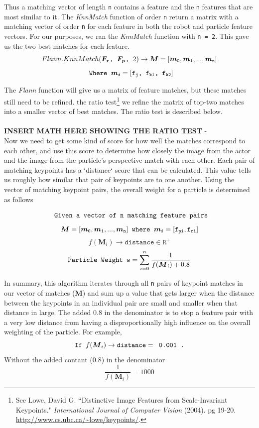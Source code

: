 \documentclass[a4paper,11pt]{article}
\begin{document}
 Thus a matching vector of length \texttt{n} contains a feature and the \texttt{n} features that are most similar to it. The \emph{KnnMatch} function of order \texttt{n} return a matrix with a matching vector of order \texttt{n} for each feature in both the robot and particle feature vectors. For our purposes, we ran the \emph{KnnMatch} function with \texttt{n = 2}. This gave us the two best matches for each feature.
 \[ Flann.KnnMatch(\boldsymbol{F_r} \verb., . \boldsymbol{F_p} \verb., . 2) \to \boldsymbol{M} = \mathtt{ [\boldsymbol{m}_0, \boldsymbol{m}_1, ... , \boldsymbol{m}_n ]} \]
 \[ \verb. Where . \boldsymbol{m_i} = \mathtt{ [f_{j}} \verb., . \mathtt{f_{k1}} \verb., . \mathtt{f_{k2}} ]\]

 The \emph{Flann} function will give us a matrix of feature matches, but these matches still need to be refined. the ratio test\footnote{See Lowe, David G. ``Distinctive Image Features from Scale-Invariant Keypoints." {\it International Journal of Computer Vision} (2004). pg 19-20.  \url{http://www.cs.ubc.ca/~lowe/keypoints/}.} we refine the matrix of top-two matches into a smaller vector of best matches. The ratio test is described below.
\\ \\
 \textbf{INSERT MATH HERE SHOWING THE RATIO TEST}
-\\
  Now we need to get some kind of score for how well the matches correspond to each other, and use this score to determine how closely the image from the actor and the image from the particle's perspective match with each other. Each pair of matching keypoints has a `distance` score that can be calculated. This value tells us roughly how similar that pair of keypoints are to one another. Using the vector of matching keypoint pairs, the overall weight for a particle is determined as follows

\[  \verb. Given a vector of . \mathtt{n} \verb. matching feature pairs. \]
\[  \boldsymbol{M} = \mathtt{ [\boldsymbol{m}_0, \boldsymbol{m}_1, ... , \boldsymbol{m}_n} ]  \verb. where . \boldsymbol{m_i} = \mathtt{ \mathtt{[f_{pi}, f_{ri}]} }   \]
\[  f(\boldsymbol{M}_i) \to \mathtt{distance} \in \mathtt{R^+}   \]
\[  \verb.Particle Weight . \mathtt{w} = \sum_{i=0}^{n} \frac 1{f(\boldsymbol{M}_i) + 0.8} \]

In summary, this algorithm iterates through all \texttt{n} pairs of keypoint matches in our vector of matches (\textbf{M}) and sum up a value that gets larger when the distance between the keypoints in an individual pair are small and smaller when that distance in large. The added 0.8 in the denominator is to stop a feature pair with a very low distance from having a disproportionally high influence on the overall weighting of the particle. For example,
\[ \verb.If . f(\boldsymbol{M}_i) \to \mathtt{distance} = \verb, 0.001 ., \]
Without the added contant (0.8) in the denominator
\[ \frac 1{f(\boldsymbol{M}_i)} = 1000\]
\end{document}
